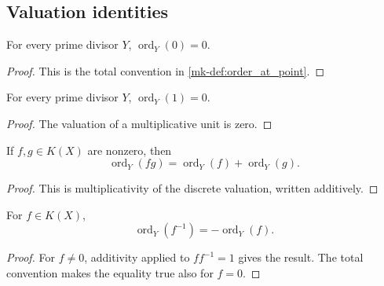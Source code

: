 \subsection{Valuation identities}
\label{mk-subsec:order_identities}

\begin{lemma}
  \label{mk-lem:order_zero}
  \leanok

  For every prime divisor \(Y\), \(\operatorname{ord}_Y(0)=0\).
\end{lemma}
\begin{proof}
  \leanok
  This is the total convention in \ref{mk-def:order_at_point}.
\end{proof}

\begin{lemma}
  \label{mk-lem:order_one}
  \leanok

  For every prime divisor \(Y\), \(\operatorname{ord}_Y(1)=0\).
\end{lemma}
\begin{proof}
  \leanok
  The valuation of a multiplicative unit is zero.
\end{proof}

\begin{lemma}
  \label{mk-lem:order_mul_of_ne_zero}
  \leanok

  If \(f,g\in K(X)\) are nonzero, then
  \[
    \operatorname{ord}_Y(fg)
      =\operatorname{ord}_Y(f)+\operatorname{ord}_Y(g).
  \]
\end{lemma}
\begin{proof}
  \leanok
  This is multiplicativity of the discrete valuation, written additively.
\end{proof}

\begin{lemma}
  \label{mk-lem:order_inv}
  \leanok

  For \(f\in K(X)\),
  \[
    \operatorname{ord}_Y(f^{-1})=-\operatorname{ord}_Y(f).
  \]
\end{lemma}
\begin{proof}
  \leanok
  For \(f\neq0\), additivity applied to \(ff^{-1}=1\) gives the result.  The
  total convention makes the equality true also for \(f=0\).
\end{proof}

